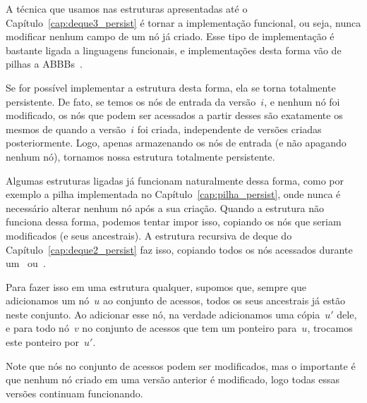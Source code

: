 \documentclass[main.tex]{subfiles}
\begin{document}
A técnica que usamos nas estruturas apresentadas até o Capítulo~\ref{cap:deque3_persist} é tornar a implementação funcional, ou seja, nunca modificar nenhum campo de um nó já criado. Esse tipo de implementação é bastante ligada a linguagens funcionais, e implementações desta forma vão de pilhas a ABBBs~\cite{HoodMelville,KaplanT1999,Myers83,Myers84}.

Se for possível implementar a estrutura desta forma, ela se torna totalmente persistente. De fato, se temos os nós de entrada da versão~$i$, e nenhum nó foi modificado, os nós que podem ser acessados a partir desses são exatamente os mesmos de quando a versão~$i$ foi criada, independente de versões criadas posteriormente. Logo, apenas armazenando os nós de entrada (e não apagando nenhum nó), tornamos nossa estrutura totalmente persistente.

Algumas estruturas ligadas já funcionam naturalmente dessa forma, como por exemplo a pilha implementada no Capítulo~\ref{cap:pilha_persist}, onde nunca é necessário alterar nenhum nó após a sua criação. Quando a estrutura não funciona dessa forma, podemos tentar impor isso, copiando os nós que seriam modificados (e seus ancestrais). A estrutura recursiva de deque do Capítulo~\ref{cap:deque2_persist} faz isso, copiando todos os nós acessados durante um~ ou~.

Para fazer isso em uma estrutura qualquer, supomos que, sempre que adicionamos um nó~$u$ ao conjunto de acessos, todos os seus ancestrais já estão neste conjunto. Ao adicionar esse nó, na verdade adicionamos uma cópia~$u'$ dele, e para todo nó~$v$ no conjunto de acessos que tem um ponteiro para~$u$, trocamos este ponteiro por~$u'$.

Note que nós no conjunto de acessos podem ser modificados, mas o importante é que nenhum nó criado em uma versão anterior é modificado, logo todas essas versões continuam funcionando.
\end{document}
